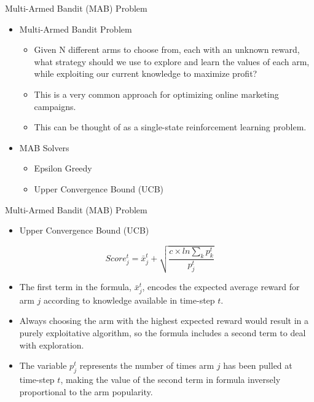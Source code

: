 \documentclass{beamer}
\begin{document}
\begin{frame}[t]{Multi-Armed Bandit (MAB) Problem} %
\begin{itemize}
\item Multi-Armed Bandit Problem
	\begin{itemize}
	\item Given N different arms to choose from, each with an unknown reward, what strategy should we use to explore and learn the values of each arm, while exploiting our current knowledge to maximize profit?
	\item This is a very common approach for optimizing online marketing campaigns.
	\item This can be thought of as a single-state reinforcement learning problem.
	\end{itemize}
\item MAB Solvers
	\begin{itemize}
	\item Epsilon Greedy
	\item Upper Convergence Bound (UCB)
	\end{itemize}
\end{itemize}			
\end{frame}


\begin{frame}[t]{Multi-Armed Bandit (MAB) Problem} %
\begin{itemize}
\item Upper Convergence Bound (UCB)
\end{itemize}
\begin{equation}
Score_{j}^{t}=\bar{x}_{j}^{t}+\sqrt{\frac{c\times ln\sum_{k}p_{k}^{t}}{p_{j}^{t}}}
\end{equation}
\footnotesize
\begin{itemize}
\item  The first term in the formula, $\bar{x}_{j}^{t}$, encodes the expected average reward for arm $j$ according to knowledge available in time-step $t$.
\item Always choosing the arm with the highest expected reward would result in a purely exploitative algorithm, so the formula includes a second term to deal with exploration.
\item The variable $p_{j}^{t}$ represents the number of times arm $j$ has been pulled at time-step $t$, making the value of the second term in formula inversely proportional to the arm popularity.
\end{itemize}
\end{frame}
\end{document}
